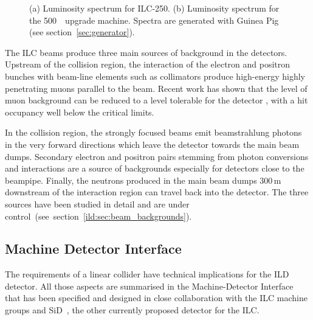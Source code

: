 \begin{figure}[htbp]
\begin{subfigure}{0.49\hsize}
 \caption{  \label{fig:ilc:ecmspect-500}}
 \end{subfigure}
\caption{
(a) Luminosity spectrum for ILC-250.
(b) Luminosity spectrum for the 500~\GeV~upgrade machine.
Spectra are generated with Guinea Pig (see section~\ref{sec:generator}).
}
\label{fig:ilc:ecmspect}
\end{figure}

The ILC beams produce three main sources of background in the detectors. Upstream of the collision region, the interaction of the electron and positron bunches with beam-line elements such as collimators produce high-energy highly penetrating muons parallel to the beam. Recent work has shown that the level of muon background can be reduced to a level tolerable for the detector \cite{Keller:2019aak}, with a hit occupancy well below the critical limits. 

In the collision region, the strongly focused beams emit beamstrahlung photons in the very forward directions which leave the detector towards the main beam dumps. Secondary electron and positron pairs stemming from photon conversions and interactions are a source of backgrounds especially for detectors close to the beampipe. Finally, the neutrons produced in the main beam dumps 300\,m downstream of the interaction region can travel back into the detector. The three sources have been studied in detail and are under control~(see~section~\ref{ild:sec:beam_backgrounds}).

\subsection{Machine Detector Interface}
The requirements of a linear collider have technical implications for the ILD detector. All those aspects are summarised in the Machine-Detector Interface that has been specified and designed in close collaboration with the ILC machine groups and SiD~\cite{bib:sid:loi}, the other currently proposed detector for the ILC.

